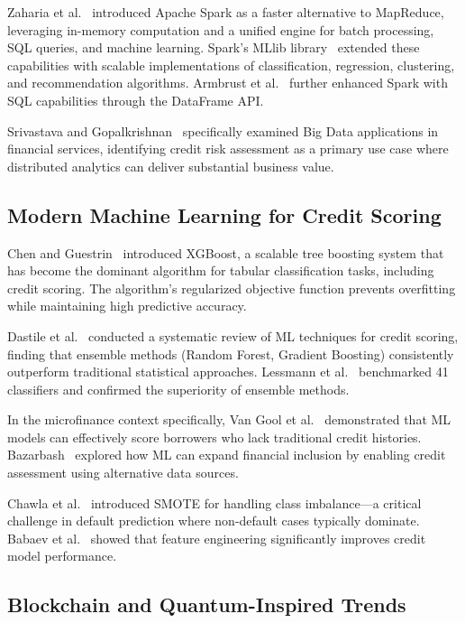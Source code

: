 \documentclass[preprint,12pt,authoryear]{elsarticle}
\begin{document}
Zaharia et al.~\cite{zaharia2016spark} introduced Apache Spark as a faster alternative to MapReduce, leveraging in-memory computation and a unified engine for batch processing, SQL queries, and machine learning. Spark's MLlib library~\cite{meng2016mllib} extended these capabilities with scalable implementations of classification, regression, clustering, and recommendation algorithms. Armbrust et al.~\cite{armbrust2015sparksql} further enhanced Spark with SQL capabilities through the DataFrame API.

Srivastava and Gopalkrishnan~\cite{srivastava2015finbda} specifically examined Big Data applications in financial services, identifying credit risk assessment as a primary use case where distributed analytics can deliver substantial business value.

\subsection{Modern Machine Learning for Credit Scoring}

Chen and Guestrin~\cite{chen2016xgboost} introduced XGBoost, a scalable tree boosting system that has become the dominant algorithm for tabular classification tasks, including credit scoring. The algorithm's regularized objective function prevents overfitting while maintaining high predictive accuracy.

Dastile et al.~\cite{dastile2020credit} conducted a systematic review of ML techniques for credit scoring, finding that ensemble methods (Random Forest, Gradient Boosting) consistently outperform traditional statistical approaches. Lessmann et al.~\cite{lessmann2015credit} benchmarked 41 classifiers and confirmed the superiority of ensemble methods.

In the microfinance context specifically, Van Gool et al.~\cite{vangool2012microfinance} demonstrated that ML models can effectively score borrowers who lack traditional credit histories. Bazarbash~\cite{bazarbash2019financial} explored how ML can expand financial inclusion by enabling credit assessment using alternative data sources.

Chawla et al.~\cite{chawla2002smote} introduced SMOTE for handling class imbalance---a critical challenge in default prediction where non-default cases typically dominate. Babaev et al.~\cite{babaev2019features} showed that feature engineering significantly improves credit model performance.

\subsection{Blockchain and Quantum-Inspired Trends}
\end{document}
